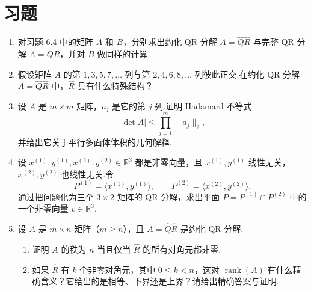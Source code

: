 \documentclass[UTF8,fontset=none,12pt]{ctexart}
\newcommand{\R}{\mathbb{R}}
\newcommand{\rank}{\operatorname{rank}}
\theoremstyle{definition}
\begin{document}
\section*{习题}

\begin{enumerate}[label=\textbf{7.\arabic*}]
    \item 对习题 6.4 中的矩阵 $A$ 和 $B$，分别求出约化 QR 分解 $A=\widehat Q\widehat R$ 与完整 QR 分解 $A=QR$，并对 $B$ 做同样的计算.

    \item 假设矩阵 $A$ 的第 $1,3,5,7,\ldots$ 列与第 $2,4,6,8,\ldots$ 列彼此正交.在约化 QR 分解 $A=\widehat Q\widehat R$ 中，$\widehat R$ 具有什么特殊结构？

    \item 设 $A$ 是 $m\times m$ 矩阵，$a_j$ 是它的第 $j$ 列.证明 Hadamard 不等式
    \[
        |\det A|\le\prod_{j=1}^{m}\|a_j\|_2,
    \]
    并给出它关于平行多面体体积的几何解释.

    \item 设 $x^{(1)},y^{(1)},x^{(2)},y^{(2)}\in\R^3$ 都是非零向量，且 $x^{(1)},y^{(1)}$ 线性无关，$x^{(2)},y^{(2)}$ 也线性无关.令
    \[
        P^{(1)}=\langle x^{(1)},y^{(1)}\rangle,\qquad
        P^{(2)}=\langle x^{(2)},y^{(2)}\rangle.
    \]
    通过把问题化为三个 $3\times2$ 矩阵的 QR 分解，求出平面 $P=P^{(1)}\cap P^{(2)}$ 中的一个非零向量 $v\in\R^3$.

    \item 设 $A$ 是 $m\times n$ 矩阵（$m\ge n$），且 $A=\widehat Q\widehat R$ 是约化 QR 分解.
    \begin{enumerate}[label=(\alph*)]
        \item 证明 $A$ 的秩为 $n$ 当且仅当 $\widehat R$ 的所有对角元都非零.
        \item 如果 $\widehat R$ 有 $k$ 个非零对角元，其中 $0\le k<n$，这对 $\rank(A)$ 有什么精确含义？它给出的是相等、下界还是上界？请给出精确答案与证明.
    \end{enumerate}
\end{enumerate}
\end{document}
